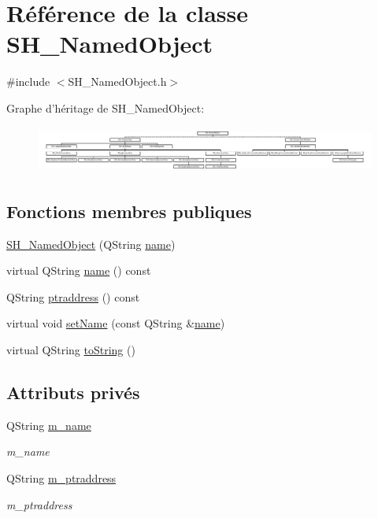 \hypertarget{classSH__NamedObject}{\section{Référence de la classe S\-H\-\_\-\-Named\-Object}
\label{classSH__NamedObject}
}


{\ttfamily \#include $<$S\-H\-\_\-\-Named\-Object.\-h$>$}

Graphe d'héritage de S\-H\-\_\-\-Named\-Object\-:\begin{figure}[H]
\begin{center}
\leavevmode
\includegraphics[height=1.541284cm]{classSH__NamedObject}
\end{center}
\end{figure}
\subsection*{Fonctions membres publiques}
\begin{DoxyCompactItemize}
\item 
\hyperlink{classSH__NamedObject_a6ceff219e80ad3f5c36db5f4258e74fd}{S\-H\-\_\-\-Named\-Object} (Q\-String \hyperlink{classSH__NamedObject_a9f686c6f2a5bcc08ad03d0cee0151f0f}{name})
\item 
virtual Q\-String \hyperlink{classSH__NamedObject_a9f686c6f2a5bcc08ad03d0cee0151f0f}{name} () const 
\item 
Q\-String \hyperlink{classSH__NamedObject_a147d0e52d9f0fc1d3a423d02f82325f5}{ptraddress} () const 
\item 
virtual void \hyperlink{classSH__NamedObject_a6bc164e6fa10ae190770529af75d1775}{set\-Name} (const Q\-String \&\hyperlink{classSH__NamedObject_a9f686c6f2a5bcc08ad03d0cee0151f0f}{name})
\item 
virtual Q\-String \hyperlink{classSH__NamedObject_a9f4b19df6a96a17daaf1060b3019ef47}{to\-String} ()
\end{DoxyCompactItemize}
\subsection*{Attributs privés}
\begin{DoxyCompactItemize}
\item 
Q\-String \hyperlink{classSH__NamedObject_a7f8e3346256986c337a792339ea5a015}{m\-\_\-name}
\begin{DoxyCompactList}\small\item\em m\-\_\-name \end{DoxyCompactList}\item 
Q\-String \hyperlink{classSH__NamedObject_acfc489299f90750082785bf9ac42f4ff}{m\-\_\-ptraddress}
\begin{DoxyCompactList}\small\item\em m\-\_\-ptraddress \end{DoxyCompactList}\end{DoxyCompactItemize}



